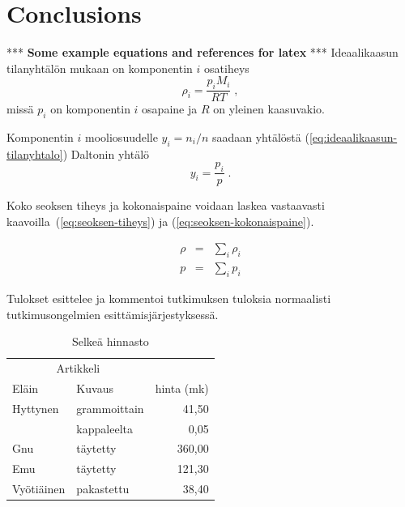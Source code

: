 \documentclass[draft]{jyflluk}
\begin{document}
\section{Conclusions}
\label{sec:conclusions}

*** \textbf{Some example equations and references for latex} ***
\newline
Ideaalikaasun tilanyhtälön mukaan on komponentin $i$ osatiheys
%
\begin{equation}
   \label{eq:ideaalikaasun-tilanyhtalo}
   \rho_i = \frac{p_i M_i}{R T}\;,
\end{equation}
%
missä $p_i$ on komponentin $i$ osapaine ja $R$ on yleinen kaasuvakio. 

Komponentin $i$ mooliosuudelle $y_i = n_i/n$ saadaan yhtälöstä (\ref{eq:ideaalikaasun-tilanyhtalo}) Daltonin yhtälö
%
\begin{equation}
   \label{eq:daltonin-yhtalo}
   y_i = \frac{p_i}{p}\;.
\end{equation}

Koko seoksen tiheys ja kokonaispaine voidaan laskea vastaavasti kaavoilla~(\ref{eq:seoksen-tiheys}) ja (\ref{eq:seoksen-kokonaispaine}).

\begin{eqnarray}
   \rho & = & \sum_i \rho_i \label{eq:seoksen-tiheys} \\
   p & = & \sum_i p_i \label{eq:seoksen-kokonaispaine}
\end{eqnarray}




Tulokset esittelee ja kommentoi tutkimuksen tuloksia normaalisti tutkimusongelmien esittämisjärjestyksessä.

\begin{table}[h]
   \centering
   \caption{Selkeä hinnasto}
   \begin{tabular}{llr} \toprule
      \multicolumn{2}{c}{Artikkeli} \\ \cmidrule(r){1-2}
      Eläin    & Kuvaus       & hinta (mk) \\ \midrule
      Hyttynen & grammoittain &  41,50 \\
               & kappaleelta  &   0,05 \\
							
      Gnu      & täytetty     & 360,00 \\
      Emu      & täytetty     & 121,30 \\
      Vyötiäinen & pakastettu &  38,40 \\ \bottomrule
   \end{tabular}
\end{table}
\end{document}
